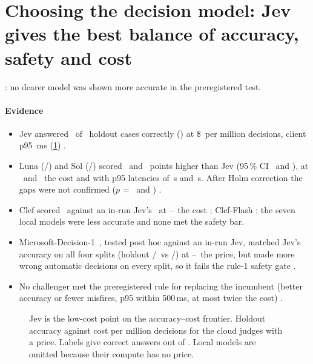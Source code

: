 \section{Choosing the decision model: Jev gives the best balance of accuracy, safety and cost}\label{sec:choose}

\begin{claimbox}
: no dearer model was shown more accurate in the preregistered test.
\end{claimbox}

\paragraph{Evidence}
\begin{itemize}[leftmargin=1.2em]
  \item Jev answered \JevHoldAccK\ of \HoldN\ holdout cases correctly (\JevHoldAccCI) at \$\JevHoldCost\ per million
    decisions, client p95 \JevHoldPninetyfiveRange\,ms (\cref{fig:frontier}) \prereg.
  \item Luna (\LunaHoldAccK/\HoldN) and Sol (\SolHoldAccK/\HoldN) scored \LunaHoldRAccDiff\ and \SolHoldRAccDiff\ points higher than Jev
    (95\,\% CI \LunaHoldRAccDiffCI\ and \SolHoldRAccDiffCI), at \LunaHoldCostX\X\ and \SolHoldCostX\X\ the cost and with
    p95 latencies of \LunaHoldPninetyfiveRangeS\,s and \SolHoldPninetyfiveRangeS\,s. After Holm correction the gaps were
    not confirmed ($p$ = \LunaHoldRAccPHolm\ and \SolHoldRAccPHolm) \prereg.
  \item Clef scored \ClHoldClefAcc\ against an in-run Jev's \ClHoldJevAcc\ at \ClClefCostXLow--\ClClefCostXHigh\X\ the cost
    \posthoc; Clef-Flash \ClHoldFlashAcc; the seven local models were less accurate and none met the safety bar.
  \item Microsoft-Decision-1~\cite{msd1router}, tested post hoc against an in-run Jev, matched Jev's accuracy on all four
    splits (holdout \MsHoldoutMsK/\MsHoldoutMsN\ vs \MsHoldoutJevK/\MsHoldoutJevN) at \MsPriceXLo--\MsPriceXHi\X\ the price,
    but made more wrong automatic decisions on every split, so it fails the rule-1 safety gate \posthoc.
  \item No challenger met the preregistered rule for replacing the incumbent (better accuracy or fewer misfires, p95
    within 500\,ms, at most twice the cost) \prereg.
\end{itemize}

\begin{figure}[tbp]
\centering
{}\par\smallskip

\caption{Jev is the low-cost point on the accuracy--cost frontier. Holdout accuracy against cost per million
decisions for the cloud judges with a price. Labels give correct answers out of \HoldN. Local models are omitted
because their compute has no price.}
\label{fig:frontier}
\end{figure}

